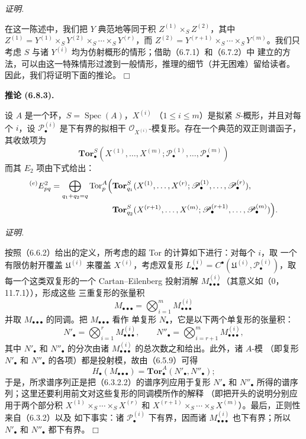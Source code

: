 \documentclass[UTF8,fontset=none,11pt,oneside,openany]{ctexbook}
\providecommand{\square}{\mdlgwhtsquare}
\newenvironment{corollary}[1][]{%
  \par\medskip\noindent\textbf{推论 (#1).}\ %
}{\par}
\newenvironment{proof}{%
  \par\smallskip\noindent\textit{证明.}\ %
}{\hfill$\square$\par}
\begin{document}
\begin{proof}
在这一陈述中，我们把 $Y$ 典范地等同于积
$Z^{(1)}\times_S Z^{(2)}$，其中
$Z^{(1)}=Y^{(1)}\times_S Y^{(2)}\times_S\cdots\times_S Y^{(r)}$，而
$Z^{(2)}=Y^{(r+1)}\times_S\cdots\times_S Y^{(m)}$。我们只考虑
$S$ 与诸 $Y^{(i)}$ 均为仿射概形的情形；借助（6.7.1）和（6.7.2）中
建立的方法，可以由这一特殊情形过渡到一般情形，推理的细节（并无困难）留给读者。
因此，我们将证明下面的推论。
\end{proof}

\begin{corollary}[6.8.3]
设 $A$ 是一个环，$S=\operatorname{Spec}(A)$，$X^{(i)}$
（$1\leq i\leq m$）是拟紧 $S$-概形，并且对每个 $i$，设
$\mathscr P_\bullet^{(i)}$ 是下有界的拟相干
$\mathscr O_{X^{(i)}}$-模复形。存在一个典范的双正则谱函子，其收敛项为
\[
  \mathbf{Tor}_\bullet^S
  (X^{(1)},\ldots,X^{(m)};
   \mathscr P_\bullet^{(1)},\ldots,\mathscr P_\bullet^{(m)})
\]
而其 $E_2$ 项由下式给出：
\[
\begin{split}
  {}^{(e)}E_{pq}^2
  =\bigoplus_{q_1+q_2=q}
  \operatorname{Tor}_p^A\Bigl(
  &\mathbf{Tor}_{q_1}^S
  (X^{(1)},\ldots,X^{(r)};
   \mathscr P_\bullet^{(1)},\ldots,\mathscr P_\bullet^{(r)}),\\
  &\mathbf{Tor}_{q_2}^S
  (X^{(r+1)},\ldots,X^{(m)};
   \mathscr P_\bullet^{(r+1)},\ldots,\mathscr P_\bullet^{(m)})
  \Bigr).
\end{split}
\]
\end{corollary}

\begin{proof}
按照（6.6.2）给出的定义，所考虑的超 Tor 的计算如下进行：对每个 $i$，取
一个有限仿射开覆盖 $\mathfrak U^{(i)}$ 来覆盖 $X^{(i)}$，考虑双复形
$L_{\bullet\bullet}^{(i)}=C^\bullet(\mathfrak U^{(i)},
\mathscr P_\bullet^{(i)})$，取每一个这类双复形的一个 Cartan--Eilenberg
投射消解 $M_{\bullet\bullet\bullet}^{(i)}$（其意义如（0，11.7.1）），形成这些
三重复形的张量积
\[
  M_{\bullet\bullet\bullet}
  =\bigotimes_{i=1}^m M_{\bullet\bullet\bullet}^{(i)}
\]
并取 $M_{\bullet\bullet\bullet}$ 的同调。把 $M_{\bullet\bullet\bullet}$ 看作
单复形 $N_\bullet$，它是以下两个单复形的张量积：
\[
  N'_\bullet=\bigotimes_{i=1}^r M_{\bullet\bullet\bullet}^{(i)},
  \qquad
  N''_\bullet=\bigotimes_{i=r+1}^m M_{\bullet\bullet\bullet}^{(i)},
\]
其中 $N'_\bullet$ 和 $N''_\bullet$ 的分次由诸
$M_{\bullet\bullet\bullet}^{(i)}$ 的总次数之和给出。此外，诸 $A$-模
（即复形 $N'_\bullet$ 和 $N''_\bullet$ 的各项）都是投射模，故由（6.5.9）可得
\[
  H_\bullet(M_{\bullet\bullet\bullet})
  =\mathbf{Tor}_\bullet^A(N'_\bullet,N''_\bullet);
\]
于是，所求谱序列正是把（6.3.2.2）的谱序列应用于复形 $N'_\bullet$ 和
$N''_\bullet$ 所得的谱序列；这里还要利用前文对这些复形的同调模所作的解释
（即把开头的说明分别应用于两个部分积
$X^{(1)}\times_S\cdots\times_S X^{(r)}$ 和
$X^{(r+1)}\times_S\cdots\times_S X^{(m)}$）。最后，正则性来自（6.3.2）以及
如下事实：诸 $\mathscr P_\bullet^{(i)}$ 下有界，因而诸
$M_{\bullet\bullet\bullet}^{(i)}$ 也下有界；所以 $N'_\bullet$ 和
$N''_\bullet$ 都下有界。
\end{proof}
\end{document}
